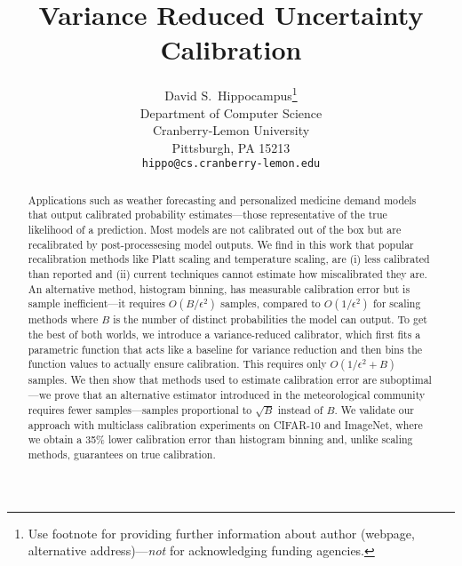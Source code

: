 \documentclass{article}
\title{Variance Reduced Uncertainty Calibration}
\author{%
  David S.~Hippocampus\thanks{Use footnote for providing further information
    about author (webpage, alternative address)---\emph{not} for acknowledging
    funding agencies.} \\
  Department of Computer Science\\
  Cranberry-Lemon University\\
  Pittsburgh, PA 15213 \\
  \texttt{hippo@cs.cranberry-lemon.edu} \\
}
\begin{document}
\maketitle

\begin{abstract}
Applications such as weather forecasting and personalized medicine demand models that output calibrated probability estimates---those representative of the true likelihood of a prediction.
Most models are not calibrated out of the box but are recalibrated by post-processesing model outputs.
We find in this work that popular recalibration methods like Platt scaling and temperature scaling,
are (i) less calibrated than reported and (ii) current techniques cannot estimate how miscalibrated they are.
  An alternative method, histogram binning, has measurable calibration error but is sample inefficient---it requires $O(B/\epsilon^2)$ samples, compared to $O(1/\epsilon^2)$ for scaling methods where $B$ is the number of distinct probabilities the model can output.
  To get the best of both worlds, we introduce a variance-reduced calibrator, which first fits a parametric function that acts like a baseline for variance reduction and then bins the function values to actually ensure calibration.
This requires only $O(1/\epsilon^2 + B)$ samples.
  We then show that methods used to estimate calibration error are suboptimal---we prove that an alternative estimator introduced in the meteorological community requires fewer samples---samples proportional to $\sqrt{B}$ instead of $B$.
We validate our approach with multiclass calibration experiments on CIFAR-10 and ImageNet, where we obtain a 35\% lower calibration error than histogram binning and, unlike scaling methods, guarantees on true calibration.


\end{abstract}
\end{document}
